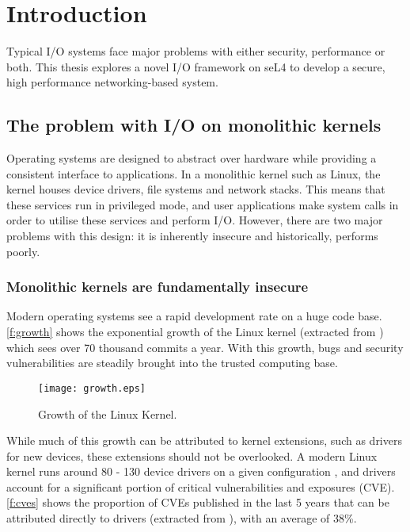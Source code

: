 \chapter{Introduction}\label{ch:intro}

Typical I/O systems face major problems with either security, performance or both.
This thesis explores a novel I/O framework on seL4 to develop a secure, high performance
networking-based system.

\section{The problem with I/O on monolithic kernels}
Operating systems are designed to abstract over hardware while
providing a consistent interface to applications. In a monolithic kernel
such as Linux, the kernel houses device drivers, file systems and network 
stacks. This means that these services run in privileged mode, and user 
applications make system calls in order to utilise these services and perform I/O.
However, there are two major problems with this design:
it is inherently insecure and historically, performs poorly.

\subsection{Monolithic kernels are fundamentally insecure}
Modern operating systems see a rapid development rate on a huge code base.
\autoref{f:growth} shows the exponential growth of the Linux kernel
(extracted from \cite{Linux:archives}) which sees over 70 thousand commits a year.
With this growth, bugs and security vulnerabilities are steadily brought into the 
trusted computing base.

\begin{figure}[h]
  \centering
  \texttt{[image: growth.eps]}
  \caption{Growth of the Linux Kernel.}
  \label{f:growth}
\end{figure}

While much of this growth can be attributed to kernel extensions, such as drivers for new devices,
these extensions should not be overlooked. A modern Linux kernel runs around 80 - 130
device drivers on a given configuration \cite{Linux:LKDDB}, and drivers account for a significant
portion of critical vulnerabilities and exposures (CVE). \autoref{f:cves} shows the proportion of 
CVEs published in the last 5 years that can be attributed directly to drivers (extracted 
from \cite{Linux:CVEs}), with an average of 38\%.


